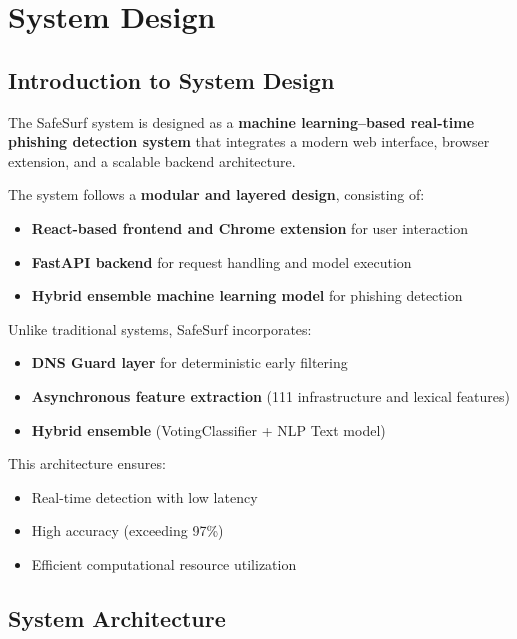 \chapter{System Design}

\section{Introduction to System Design}

The SafeSurf system is designed as a \textbf{machine learning--based real-time phishing detection system} that integrates a modern web interface, browser extension, and a scalable backend architecture.

The system follows a \textbf{modular and layered design}, consisting of:

\begin{itemize}
    \item \textbf{React-based frontend and Chrome extension} for user interaction
    \item \textbf{FastAPI backend} for request handling and model execution \cite{ref20}
    \item \textbf{Hybrid ensemble machine learning model} for phishing detection \cite{ref18}
\end{itemize}

Unlike traditional systems, SafeSurf incorporates:

\begin{itemize}
    \item \textbf{DNS Guard layer} for deterministic early filtering
    \item \textbf{Asynchronous feature extraction} (111 infrastructure and lexical features)
    \item \textbf{Hybrid ensemble} (VotingClassifier + NLP Text model)
\end{itemize}

This architecture ensures:

\begin{itemize}
    \item Real-time detection with low latency
    \item High accuracy (exceeding 97\%)
    \item Efficient computational resource utilization
\end{itemize}

\section{System Architecture}

